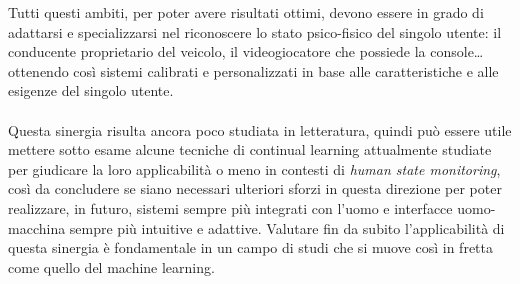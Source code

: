 Tutti questi ambiti, per poter avere risultati ottimi, devono essere in grado di adattarsi e specializzarsi nel riconoscere lo stato psico-fisico del singolo utente: il conducente proprietario del veicolo, il videogiocatore che possiede la console\ldots ottenendo così sistemi calibrati e personalizzati in base alle caratteristiche e alle esigenze del singolo utente.\\\\
Questa sinergia risulta ancora poco studiata in letteratura, quindi può essere utile mettere sotto esame alcune tecniche di continual learning attualmente studiate per giudicare la loro applicabilità o meno in contesti di \textit{human state monitoring}, così da concludere se siano necessari ulteriori sforzi in questa direzione per poter realizzare, in futuro, sistemi sempre più integrati con l'uomo e interfacce uomo-macchina sempre più intuitive e adattive. Valutare fin da subito l'applicabilità di questa sinergia è fondamentale in un campo di studi che si muove così in fretta come quello del machine learning.

